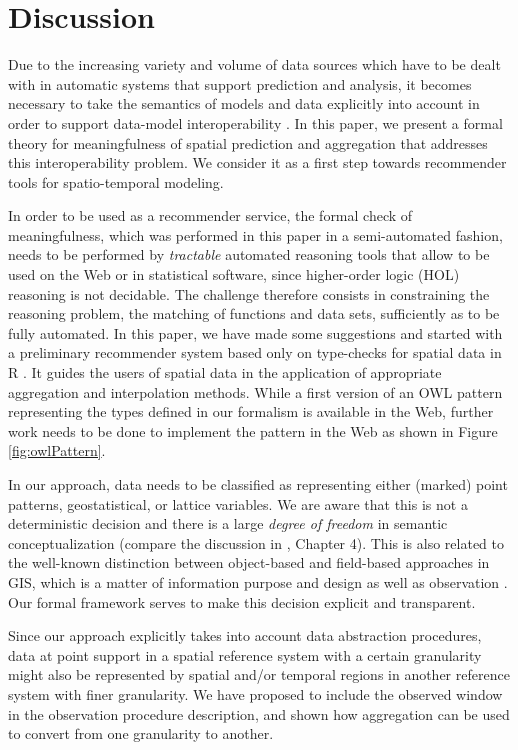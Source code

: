 \documentclass[final,authoryear,1p,times]{elsarticle}
\begin{document}
\section{Discussion}\label{discussion}

Due to the increasing variety and volume of data sources which have to be dealt with in automatic systems that support prediction and analysis, it becomes necessary to take the semantics of models and data explicitly into account in order to support data-model interoperability \citep{Bell2009,Parsons2011}. In this paper, we present a formal theory for meaningfulness of spatial prediction and aggregation that addresses this interoperability problem. We consider it as a first step towards recommender tools for spatio-temporal modeling. 

In order to be used as a recommender service, the formal check of meaningfulness, which was performed in this paper in a semi-automated fashion, needs to be performed by \textit{tractable} automated reasoning tools that allow to be used on the Web or in statistical software, since higher-order logic (HOL) reasoning is not decidable. The challenge therefore consists in constraining the reasoning problem, the  matching of functions and data sets, sufficiently as to be fully automated. In this paper, we have made some suggestions and started with a preliminary recommender system based only on type-checks for spatial data in R \citep{Pebesma2005}. It guides the users of spatial data in the application of appropriate aggregation and interpolation methods. While a first version of an OWL pattern representing the types defined in our formalism is available in the Web, further work needs to be done to implement the pattern in the Web as shown in Figure \ref{fig:owlPattern}.

In our approach, data needs to be classified as representing either (marked) point patterns, geostatistical, or lattice variables. We are aware that this is not a deterministic decision and there is a large \textit{degree of freedom} in semantic conceptualization (compare the discussion in \cite{Scheider.2011c}, Chapter 4). This is also related to the well-known distinction between object-based and field-based approaches in GIS, which is a matter of information purpose and design \citep{Couclelis.92} as well as observation \citep{Frank2009}. Our formal framework serves to make this decision explicit and transparent.

Since our approach explicitly takes into account data abstraction procedures, data at point support in a spatial reference system with a certain granularity might also be represented by spatial and/or temporal regions in another reference system with finer granularity. We have proposed to include the observed window in the observation procedure description, and shown how aggregation can be used to convert from one granularity to another.
\end{document}
